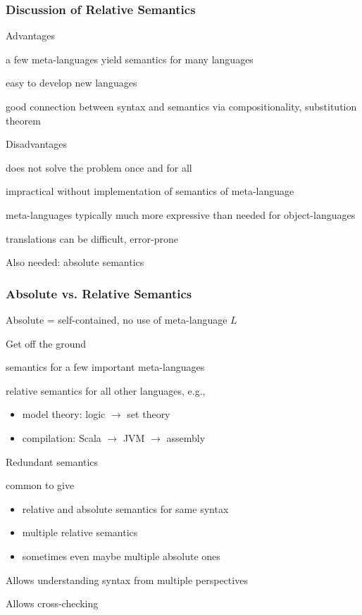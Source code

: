 \begin{frame}\frametitle{Discussion of Relative Semantics}
\begin{blockitems}{Advantages}
\item a few meta-languages yield semantics for many languages
\item easy to develop new languages
\item good connection between syntax and semantics via compositionality, substitution theorem
\end{blockitems}

\begin{blockitems}{Disadvantages}
\item does not solve the problem once and for all
\item impractical without implementation of semantics of meta-language
\item meta-languages typically much more expressive than needed for object-languages
\item translations can be difficult, error-prone
\end{blockitems}

Also needed: absolute semantics
\end{frame}

\begin{frame}\frametitle{Absolute vs. Relative Semantics}
Absolute = self-contained, no use of meta-language $L$

\begin{blockitems}{Get off the ground}
 \item semantics for a few important meta-languages
 \item relative semantics for all other languages, e.g.,
  \begin{itemize}
  \item model theory: logic $\to$ set theory
  \item compilation: Scala $\to$ JVM $\to$ assembly
  \end{itemize}
\end{blockitems}

\begin{blockitems}{Redundant semantics}
 \item common to give
 \begin{itemize}
  \item relative and absolute semantics for same syntax
  \item multiple relative semantics
  \item sometimes even maybe multiple absolute ones
 \end{itemize}
 \item Allows understanding syntax from multiple perspectives
 \item Allows cross-checking 
\end{blockitems}
\end{frame}

